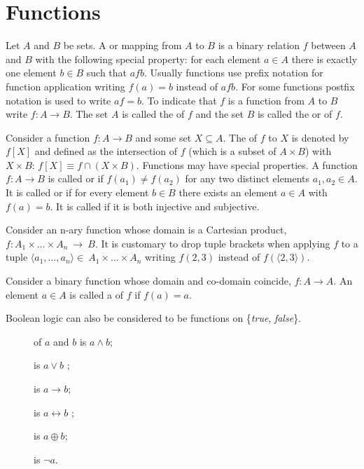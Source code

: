 \section{Functions}\label{sec:informal_functions}

\pn Let $A$ and $B$ be sets.  A  or mapping from $A$ to $B$ is a binary relation $f$
between $A$ and $B$ with the following special property:  for each element $a\in A$ there is exactly one element $b\in B$ such that $afb$.  Usually functions use prefix notation for function application writing $f(a)=b$ 
instead of $afb$.  For some functions postfix notation is used to write $af=b$.  To indicate that $f$ is a 
function from $A$ to $B$ write 
\(f:A\rightarrow B\).    
The set $A$ is called the  of $f$ and the set $B$ is called the  or  of $f$.

\pn Consider a function \(f:A\rightarrow B\) and some set $X\subseteq A$.  The  of $f$ to $X$ 
is denoted by $f[X]$ and defined as the intersection of $f$ (which is a subset of $A\times B$) with $X\times B$:
\(f[X] \equiv f\cap(X\times B)\).  
Functions may have special properties.  A function \(f:A\rightarrow B\) is called  or  if $f(a_1)\ne f(a_2)$ for any two distinct elements $a_1,a_2\in A$.  It is called  or 
 if for every element $b\in B$ there exists an element $a\in A$ with $f(a)=b$.  It is called 
 if it is both injective and subjective.

\pn Consider an n-ary function whose domain is a Cartesian product, $f:A_1 \times\ldots\times A_n~\rightarrow~B$.  It is customary to drop tuple brackets when applying $f$ to a tuple 
\(\langle a_1,\ldots,a_n\rangle\in~A_1 \times\ldots\times A_n\) 
writing $f(2,3)$ instead of $f(\langle 2,3\rangle)$.

\pn Consider a binary function whose domain and co-domain coincide, $f:A\rightarrow A$.  An element
$a\in A$ is called a  of $f$ if $f(a)=a$.


\pn Boolean logic can also be considered to be functions on \{\emph{true}, \emph{false}\}.
\begin{description}
\item[] of $a$ and $b$ is $a\wedge b$; 
\item[] is $a\vee b$ ; 
\item[] is $a\rightarrow b$; 
\item[] is $a\leftrightarrow b$ ; 
\item[] is $a\oplus b$;
\item[] is $\neg a$.
\end{description}

